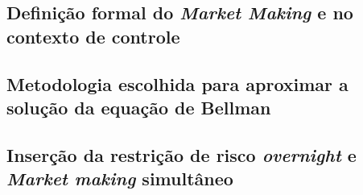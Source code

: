 \subsection{Definição formal do \textit{Market Making} e no contexto de controle}
\label{section:problem_description/definition}


\subsection{Metodologia escolhida para aproximar a solução da equação de Bellman}
\label{section:problem_description/techniques}


\subsection{Inserção da restrição de risco \textit{overnight} e \textit{Market making} simultâneo}
\label{section:problem_description/multivariate_mm}
